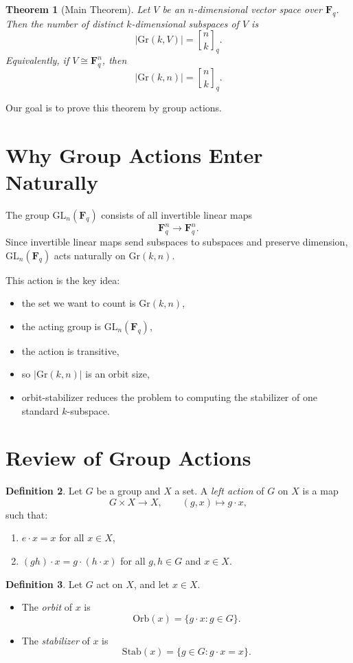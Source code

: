 \documentclass[11pt]{article}
\newtheorem{theorem}{Theorem}[section]
\theoremstyle{definition}
\newtheorem{definition}[theorem]{Definition}
\theoremstyle{remark}
\newcommand{\F}{\mathbf{F}}
\newcommand{\GL}{\mathrm{GL}}
\newcommand{\Gr}{\mathrm{Gr}}
\newcommand{\Stab}{\mathrm{Stab}}
\newcommand{\Orb}{\mathrm{Orb}}
\newcommand{\qbinom}[2]{\genfrac{[}{]}{0pt}{}{#1}{#2}_q}
\begin{document}
	\begin{theorem}[Main Theorem]
		Let \(V\) be an \(n\)-dimensional vector space over \(\F_q\). Then the number of distinct \(k\)-dimensional subspaces of \(V\) is
		\[
		|\Gr(k,V)|=\qbinom{n}{k}.
		\]
		Equivalently, if \(V\cong \F_q^n\), then
		\[
		|\Gr(k,n)|=\qbinom{n}{k}.
		\]
	\end{theorem}
	
	Our goal is to prove this theorem by group actions.
	
	\section{Why Group Actions Enter Naturally}
	
	The group \(\GL_n(\F_q)\) consists of all invertible linear maps
	\[
	\F_q^n \to \F_q^n.
	\]
	Since invertible linear maps send subspaces to subspaces and preserve dimension, \(\GL_n(\F_q)\) acts naturally on \(\Gr(k,n)\).
	
	This action is the key idea:
	\begin{itemize}
		\item the set we want to count is \(\Gr(k,n)\),
		\item the acting group is \(\GL_n(\F_q)\),
		\item the action is transitive,
		\item so \(|\Gr(k,n)|\) is an orbit size,
		\item orbit-stabilizer reduces the problem to computing the stabilizer of one standard \(k\)-subspace.
	\end{itemize}
	
	\section{Review of Group Actions}
	
	\begin{definition}
		Let \(G\) be a group and \(X\) a set. A \emph{left action} of \(G\) on \(X\) is a map
		\[
		G\times X \to X,\qquad (g,x)\mapsto g\cdot x,
		\]
		such that:
		\begin{enumerate}[label=(\arabic*)]
			\item \(e\cdot x=x\) for all \(x\in X\),
			\item \((gh)\cdot x=g\cdot(h\cdot x)\) for all \(g,h\in G\) and \(x\in X\).
		\end{enumerate}
	\end{definition}
	
	\begin{definition}
		Let \(G\) act on \(X\), and let \(x\in X\).
		\begin{itemize}
			\item The \emph{orbit} of \(x\) is
			\[
			\Orb(x)=\{g\cdot x:g\in G\}.
			\]
			\item The \emph{stabilizer} of \(x\) is
			\[
			\Stab(x)=\{g\in G:g\cdot x=x\}.
			\]
		\end{itemize}
	\end{definition}
	
\end{document}
